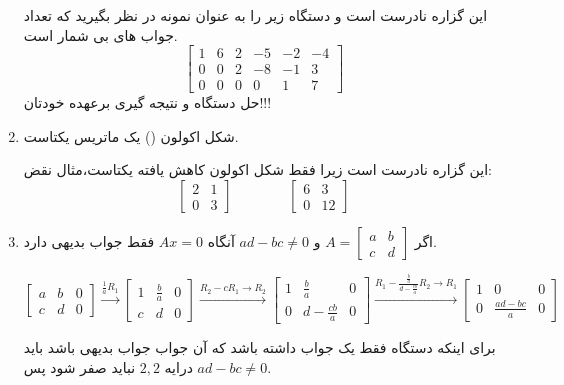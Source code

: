 \documentclass{article}
\begin{document}
\begin{enumerate}
\begin{حل}
   	این گزاره نادرست است و دستگاه زیر را به عنوان نمونه در نظر بگیرید که تعداد جواب های بی شمار است.
   	$$\begin{bmatrix}
   	1&6&2&-5&-2&-4\\
   	0&0&2&-8&-1&3\\
   	0&0&0&0&1&7
   	\end{bmatrix}$$
   	حل دستگاه و نتیجه گیری برعهده خودتان!!!
   	\end{حل}
   \item 
   شکل اکولون () یک ماتریس یکتاست.
   \begin{حل}
   	این گزاره نادرست است زیرا فقط شکل اکولون کاهش یافته یکتاست،مثال نقض:
   	$$\begin{bmatrix}
   	2&1\\
   	0&3
   	\end{bmatrix}\qquad \qquad \begin{bmatrix}
   	6&3\\
   	0&12
   	\end{bmatrix}   	$$
   	\end{حل}
   \item 
   اگر 
   $A=\begin{bmatrix}
   a&b\\
   c&d
   \end{bmatrix}$
   و
   $ad-bc\neq0$
   آنگاه 
   $Ax=0$
   فقط جواب بدیهی دارد.
   \begin{حل}
   $$\begin{bmatrix}
   a&b&0\\
   c&d&0
   \end{bmatrix}\xrightarrow{\frac{1}{a}R_1}
   \begin{bmatrix}
   1&\frac{b}{a}&0\\
   c&d&0
   \end{bmatrix}\xrightarrow{R_2-cR_1\to R_2}
   \begin{bmatrix}
   1&\frac{b}{a}&0\\
   0&d-\frac{cb}{a}&0
   \end{bmatrix}\xrightarrow{R_1-\frac{\frac{b}{a}}{d-\frac{cb}{a}}R_2\to R_1}
   \begin{bmatrix}
   1&0&0\\
   0&\frac{ad-bc}{a}&0
   \end{bmatrix}$$
   
   برای اینکه دستگاه فقط یک جواب داشته باشد که آن جواب جواب بدیهی باشد باید 
   درایه
 $2,2$
   نباید صفر شود پس  $ad-bc\neq0$.
\end{حل}   
\end{enumerate}
\end{document}
